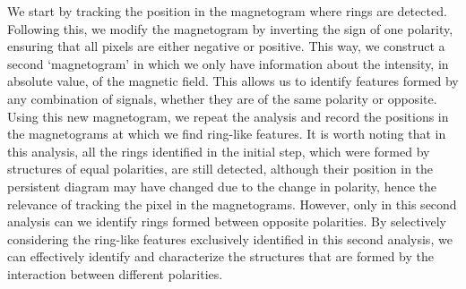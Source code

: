 We start by tracking the position in the magnetogram where rings are detected. Following this, we modify the magnetogram by inverting the sign of one polarity, ensuring that all pixels are either negative or positive. This way, we construct a second `magnetogram' in which we only have information about the intensity, in absolute value, of the magnetic field. This allows us to identify features formed by any combination of signals, whether they are of the same polarity or opposite. Using this new magnetogram, we repeat the analysis and record the positions in the magnetograms at which we find ring-like features. It is worth noting that in this analysis, all the rings identified in the initial step, which were formed by structures of equal polarities, are still detected, although their position in the persistent diagram may have changed due to the change in polarity, hence the relevance of tracking the pixel in the magnetograms. However, only in this second analysis can we identify rings formed between opposite polarities. By selectively considering the ring-like features exclusively identified in this second analysis, we can effectively identify and characterize the structures that are formed by the interaction between different polarities. 

